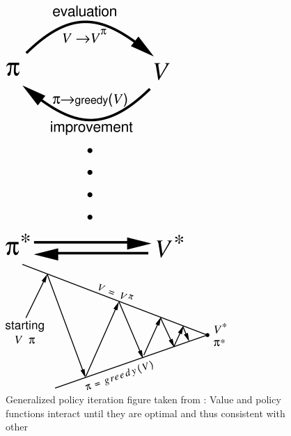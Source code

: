 \begin{figure}[!h]
	\centering
	\begin{minipage}[b]{0.25\textwidth}
		\includegraphics[width=\textwidth]{img/gpi00.png}
	\end{minipage}
	\begin{minipage}[b]{0.55\textwidth}
		\includegraphics[width=\textwidth]{img/gpi01.png}
	\end{minipage}
	\caption{Generalized policy iteration figure taken from \cite{sutton2018reinforcement}: Value and policy functions interact until they are optimal and thus consistent with other}
	\label{fig:gpi}
\end{figure}

